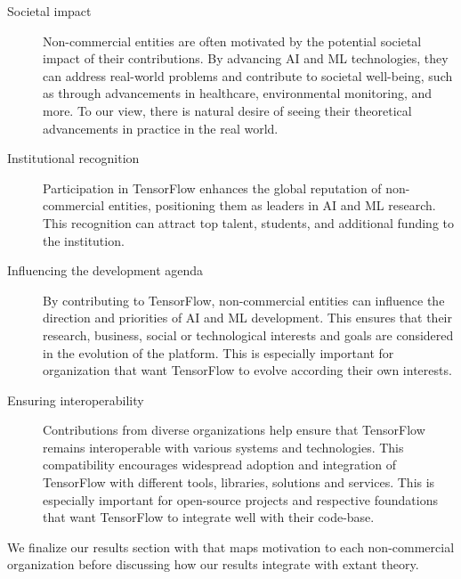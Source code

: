 \documentclass[CHICAGO,Times1COL]{WileyNJDv5} %
\begin{document}
\begin{description}
\item[Societal impact] Non-commercial entities are often motivated by the potential societal impact of their contributions. By advancing AI and ML technologies, they can address real-world problems and contribute to societal well-being, such as through advancements in healthcare, environmental monitoring, and more. To our view, there is natural desire of seeing their theoretical advancements in practice in the real world. 

\item[Institutional recognition] Participation in TensorFlow enhances the global reputation of non-commercial entities, positioning them as leaders in AI and ML research. This recognition can attract top talent, students, and additional funding to the institution.

\item[Influencing the development agenda] By contributing to TensorFlow, non-commercial entities can influence the direction and priorities of AI and ML development. This ensures that their research, business, social or technological interests and goals are considered in the evolution of the platform. This is especially important for organization that want TensorFlow to evolve according their own interests. 

\item[Ensuring interoperability] Contributions from diverse organizations help ensure that TensorFlow remains interoperable with various systems and technologies. This  compatibility encourages widespread adoption and integration of TensorFlow with different tools, libraries, solutions and services. This is especially important for open-source projects and respective foundations that want TensorFlow to integrate well with their code-base. 
\end{description}


We finalize our results section with  that maps motivation to each non-commercial organization  before discussing how our results integrate with extant theory.
\end{document}
